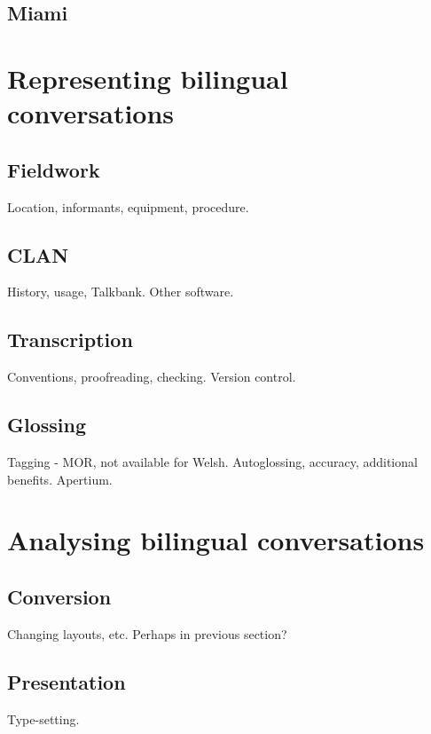 \documentclass[a4paper, twocolumn, 11pt, twoside]{article}
\begin{document}
\subsection{Miami}


\section{Representing bilingual conversations}

\subsection{Fieldwork}

Location, informants, equipment, procedure.

\subsection{CLAN}

History, usage, Talkbank.
Other software.

\subsection{Transcription}

Conventions, proofreading, checking.
Version control.

\subsection{Glossing}

Tagging - MOR, not available for Welsh.
Autoglossing, accuracy, additional benefits.
Apertium.


\section{Analysing bilingual conversations}

\subsection{Conversion}

Changing layouts, etc.  Perhaps in previous section?

\subsection{Presentation}

Type-setting.
\end{document}
